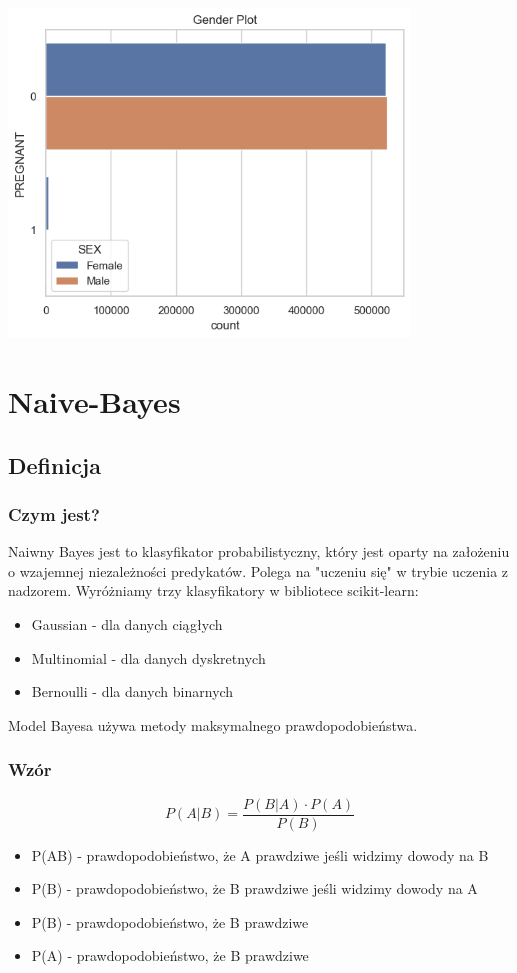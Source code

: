 \documentclass{article}
\begin{document}
{\begin{center}
\end{center}
\begin{center}
    \includegraphics[width=0.8\textwidth]{image7.png}\newline
\end{center}
\section{\LARGE{Naive-Bayes}}
\subsection{Definicja}
\subsubsection{Czym jest?}
\large{Naiwny Bayes jest to klasyfikator probabilistyczny, który jest oparty na założeniu o wzajemnej niezależności predykatów. Polega na "uczeniu się" w trybie uczenia z nadzorem.\newline
\newline
Wyróżniamy trzy klasyfikatory w bibliotece scikit-learn:
\begin{itemize}
    \item Gaussian - dla danych ciągłych
    \item Multinomial - dla danych dyskretnych
    \item Bernoulli - dla danych binarnych
\end{itemize}
\newline
Model Bayesa używa metody maksymalnego prawdopodobieństwa. }
\subsubsection{Wzór}
\[ P(A|B) = \frac{P(B|A) \cdot P(A)}{ P(B)}\]\newline 
\begin{itemize}
    \item 
        P(A\textbar B) - prawdopodobieństwo, że A prawdziwe jeśli widzimy dowody na B
    \item P(B\textbarA) - prawdopodobieństwo, że B prawdziwe jeśli widzimy dowody na A
     \item P(B) - prawdopodobieństwo, że B prawdziwe 
      \item P(A) - prawdopodobieństwo, że B prawdziwe 
\end{itemize}
\newpage
}
\end{document}
